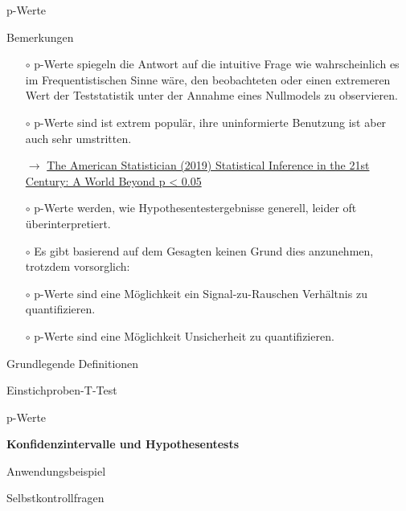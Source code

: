 \documentclass[
  8pt,
  ignorenonframetext,
]{beamer}
\begin{document}
\begin{frame}{p-Werte}
\protect\hypertarget{p-werte-4}{}
\small

Bemerkungen

\begin{itemize}
\justifying
\item[$\circ$] p-Werte spiegeln die Antwort auf die intuitive Frage wie
wahrscheinlich es im Frequentistischen Sinne wäre, den beobachteten oder einen
extremeren Wert der Teststatistik unter der Annahme eines Nullmodels zu
observieren.
\item[$\circ$] p-Werte sind ist extrem populär, ihre uninformierte Benutzung ist aber auch sehr umstritten.
\footnotesize
\item[$\rightarrow$] \href{https://www.tandfonline.com/toc/utas20/73/sup1}{The American Statistician (2019) Statistical Inference in the 21st Century: A World Beyond p < 0.05}
\small
\item[$\circ$]  p-Werte werden, wie Hypothesentestergebnisse generell, leider oft überinterpretiert.
\item[$\circ$]  Es gibt basierend auf dem Gesagten keinen Grund dies anzunehmen, trotzdem vorsorglich:
\begin{itemize}
\end{itemize}
\item[$\circ$] p-Werte sind eine Möglichkeit ein Signal-zu-Rauschen Verhältnis zu quantifizieren.
\item[$\circ$] p-Werte sind eine Möglichkeit Unsicherheit zu quantifizieren.
\end{itemize}
\end{frame}

\begin{frame}{}
\protect\hypertarget{section-10}{}
\large
\vfill

Grundlegende Definitionen

Einstichproben-T-Test

p-Werte

\textbf{Konfidenzintervalle und Hypothesentests}

Anwendungsbeispiel

Selbstkontrollfragen \vfill
\end{frame}
\end{document}
